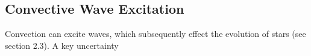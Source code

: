 {\color{purple}
\subsection{Convective Wave Excitation}
}

Convection can excite waves, which subsequently effect the evolution of stars (see section 2.3). A key uncertainty 
